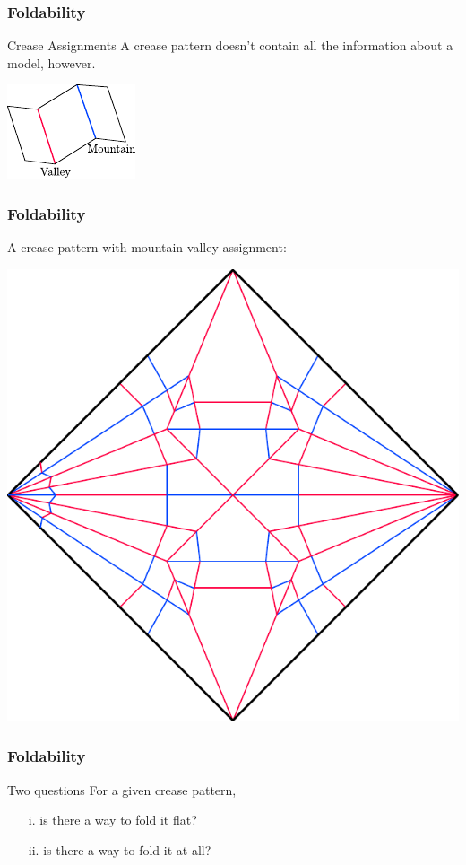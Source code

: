 \documentclass{beamer}
\begin{document}
\begin{frame}
\frametitle{Foldability}
\begin{block}{Crease Assignments}
A crease pattern doesn't contain all the information about a model, however. 
\end{block}
\begin{center}
\includegraphics[width=.5\textwidth]{foldability_pix/mountain-valley.pdf}
\end{center}
\end{frame}

\begin{frame}
\frametitle{Foldability}
\begin{block}{}
A crease pattern with mountain-valley assignment: 
\end{block}
\begin{center}
\includegraphics[width=.5\textwidth]{foldability_pix/crane-assigned.pdf}
\end{center}
\end{frame}

\begin{frame}
\frametitle{Foldability}
\begin{block}{Two questions}
For a given crease pattern,
\begin{enumerate}
\item[i.]
is there a way to fold it flat?
\item[ii.]
is there a way to fold it at all?
\end{enumerate}
\end{block}
\end{frame}
\end{document}
